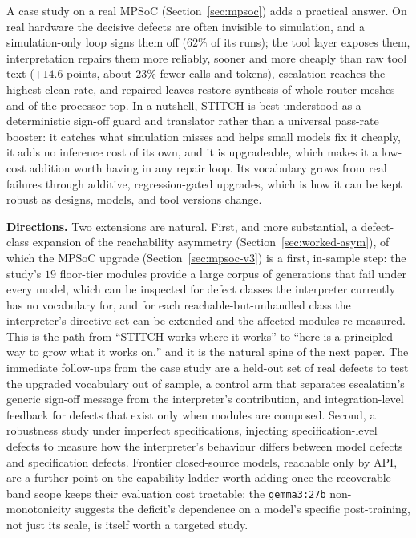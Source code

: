 \documentclass[11pt]{article}
\begin{document}
A case study on a real MPSoC (Section~\ref{sec:mpsoc}) adds a practical
answer. On real hardware the decisive defects are often invisible to
simulation, and a simulation-only loop signs them off ($62\%$ of its runs);
the tool layer exposes them, interpretation repairs them more reliably, sooner
and more cheaply than raw tool text ($+14.6$ points, about $23\%$ fewer calls
and tokens), escalation reaches the highest clean rate, and repaired leaves
restore synthesis of whole router meshes and of the processor top. In a
nutshell, STITCH is best understood as a deterministic sign-off guard and
translator rather than a universal pass-rate booster: it catches what
simulation misses and helps small models fix it cheaply, it adds no inference
cost of its own, and it is upgradeable, which makes it a low-cost addition
worth having in any repair loop. Its vocabulary grows from real failures
through additive, regression-gated upgrades, which is how it can be kept
robust as designs, models, and tool versions change.

\textbf{Directions.} Two extensions are natural. First, and more substantial,
a defect-class expansion of the reachability asymmetry
(Section~\ref{sec:worked-asym}), of which the MPSoC upgrade
(Section~\ref{sec:mpsoc-v3}) is a first, in-sample step: the study's $19$
floor-tier modules provide a large corpus of generations that fail under every
model, which can be inspected for defect classes the interpreter currently has
no vocabulary for, and for each reachable-but-unhandled class the interpreter's
directive set can be extended and the affected modules re-measured. This is the
path from ``STITCH works where it works'' to ``here is a principled way to grow
what it works on,'' and it is the natural spine of the next paper. The
immediate follow-ups from the case study are a held-out set of real defects to
test the upgraded vocabulary out of sample, a control arm that separates
escalation's generic sign-off message from the interpreter's contribution, and
integration-level feedback for defects that exist only when modules are
composed. Second, a robustness study under imperfect specifications, injecting
specification-level defects to measure how the interpreter's behaviour differs
between model defects and specification defects. Frontier closed-source models,
reachable only by API, are a further point on the capability ladder worth
adding once the recoverable-band scope keeps their evaluation cost tractable;
the \texttt{gemma3:27b} non-monotonicity suggests the deficit's dependence on a
model's specific post-training, not just its scale, is itself worth a targeted
study.
\end{document}

